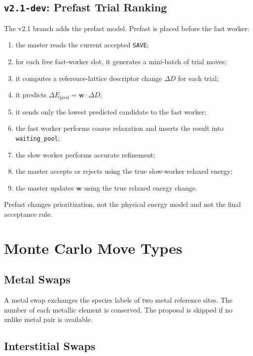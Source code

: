 \documentclass[11pt]{article}
\begin{document}
\subsection{\texttt{v2.1-dev}: Prefast Trial Ranking}

The v2.1 branch adds the prefast model.
Prefast is placed before the fast worker:

\begin{enumerate}
  \item the master reads the current accepted \texttt{SAVE};
  \item for each free fast-worker slot, it generates a mini-batch of trial moves;
  \item it computes a reference-lattice descriptor change $\Delta D$ for each trial;
  \item it predicts $\Delta E_{\mathrm{pred}} = \mathbf{w}\cdot\Delta D$;
  \item it sends only the lowest predicted candidate to the fast worker;
  \item the fast worker performs coarse relaxation and inserts the result into \texttt{waiting\_pool};
  \item the slow worker performs accurate refinement;
  \item the master accepts or rejects using the true slow-worker relaxed energy;
  \item the master updates $\mathbf{w}$ using the true relaxed energy change.
\end{enumerate}

Prefast changes prioritization, not the physical energy model and not the final acceptance rule.

\section{Monte Carlo Move Types}

\subsection{Metal Swaps}

A metal swap exchanges the species labels of two metal reference sites.
The number of each metallic element is conserved.
The proposal is skipped if no unlike metal pair is available.

\subsection{Interstitial Swaps}
\end{document}
